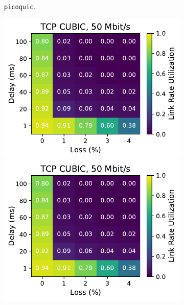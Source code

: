 \begin{figure}[ht]
\begin{subfigure}[b]{0.22\linewidth}
        \caption{\texttt{picoquic}.}
    \end{subfigure}
    \begin{subfigure}[b]{1cm}
        \includegraphics[width=\linewidth,trim={8cm 0 0 0},clip]{figures/heatmaps/heatmap_tcp_cubic_50mbps.pdf}
        \vspace*{0.22cm}
        \includegraphics[width=\linewidth,trim={8cm 0 0 0},clip]{figures/heatmaps/heatmap_tcp_cubic_50mbps.pdf}
        \vspace*{0.22cm}

\end{subfigure}
\end{figure}
